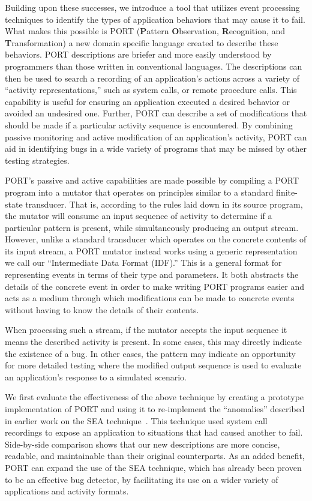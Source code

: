 Building upon these successes,
we introduce a tool
that utilizes event processing techniques
to identify
the types of application behaviors 
that may cause it to fail.
What makes this possible is PORT
(\textbf{P}attern \textbf{O}bservation, \textbf{R}ecognition, and
\textbf{T}ransformation)
a new domain specific language
created to describe these behaviors.
PORT  descriptions are briefer and more easily understood by programmers than those written in conventional languages. The descriptions can then be used
to search a recording of an application's actions
across a variety of ``activity representations,''
such as system calls,
or remote procedure calls.
This capability is useful
for ensuring an application executed a desired behavior
or avoided an undesired one.
Further, PORT can describe
a set of modifications
that should be made
if a particular activity sequence is encountered.
By combining passive monitoring and active modification
of an application's activity,
PORT can aid in identifying bugs
in a wide variety of programs
that may be missed by other testing strategies.

PORT's passive and active capabilities are made possible
by compiling a PORT program
into a mutator
that operates on principles similar
to a standard finite-state transducer.
That is,
according to the rules laid down in its source program,
the mutator will consume an input sequence of activity
to determine if a particular pattern is present,
while simultaneously producing an output stream.
However, unlike a standard transducer which operates on the concrete contents of its input stream,
a PORT mutator instead works using a generic representation we call our ``Intermediate Data Format (IDF).''
This is a general format for representing events in terms of their type and parameters.
It both abstracts the details of the concrete event in order to make writing PORT programs easier
and acts as a medium through which modifications can be made to concrete events without having to
know the details of their contents.

When processing such a stream, if the mutator accepts the input sequence
it means the described activity is present.
In some cases,
this may directly indicate
the existence of a bug.
In other cases,
the pattern may
indicate an opportunity
for more detailed testing
where the modified output sequence is used
to evaluate an application's response to a simulated scenario.

We first evaluate the effectiveness of the above technique
by creating a prototype implementation of PORT
and using it to
re-implement the ``anomalies''
described in earlier work on the SEA technique~\cite{DBLP:conf/issre/MooreCFW19}.
This technique used system call recordings
to expose an application to situations that had caused another to fail.
Side-by-side comparison shows that our new
descriptions are more concise,
readable,
and maintainable
than their original counterparts.
As an added benefit,
PORT can expand the use of the SEA technique,
which has already been proven
to be an effective bug detector,
by facilitating its use
on a wider variety of applications and activity formats.


